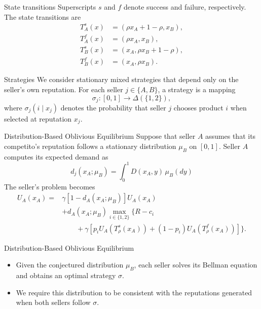 \documentclass[10pt]{beamer}
\begin{document}
\begin{frame}{State transitions}
    Superscripts $s$ and $f$ denote success and failure,
    respectively. The state transitions are
    \begin{equation}
        \begin{aligned}
            T_A^s(x)&=(\rho x_A+1-\rho,x_B),\\
            T_A^f(x)&=(\rho x_A,x_B),\\
            T_B^s(x)&=(x_A,\rho x_B+1-\rho),\\
            T_B^f(x)&=(x_A,\rho x_B).
        \end{aligned}
    \end{equation}
\end{frame}

\begin{frame}{Strategies}
    We consider stationary mixed strategies that depend only
    on the seller's own reputation. For each seller $j\in\{A,B\}$,
    a strategy is a mapping
    \begin{equation}
        \sigma_j:[0,1]\rightarrow\Delta(\{1,2\}),
    \end{equation}
    where $\sigma_j(i\mid x_j)$ denotes the probability that
    seller $j$ chooses product $i$ when selected at reputation
    $x_j$.
\end{frame}

\begin{frame}{Distribution-Based Oblivious Equilibrium}
    Suppose that seller $A$ assumes that its competito's reputation follows a stationary distribution $\mu_B$ on $[0,1]$. Seller $A$ computes its expected demand as 
    \begin{equation}
        d_j(x_A;\mu_{B}) =\int_0^1 D(x_A,y)\,\mu_{B}(dy)
    \end{equation}
    The seller's problem becomes 
    \begin{equation}
        \begin{aligned}
            U_A(x_A) ={}& \gamma[1-d_A(x_A;\mu_{B})]U_A(x_A)\\ &+ d_A(x_A;\mu_{B})
            \max_{i\in\{1,2\}}\Big\{ R-c_i\\
            &\qquad+\gamma\left[ p_i U_A(T_\rho^s(x_A)) + (1-p_i)U_A(T_\rho^f(x_A))
            \right] \Big\}.
        \end{aligned}
    \end{equation}
\end{frame}

\begin{frame}{Distribution-Based Oblivious Equilibrium}
    \begin{itemize}
        \item Given the conjectured distribution $\mu_B$, each seller solves its Bellman equation and obtains an optimal strategy $\sigma$.
        \item We require this distribution to be consistent with the reputations generated when both sellers follow $\sigma$.
    \end{itemize}
\end{frame}
\end{document}
